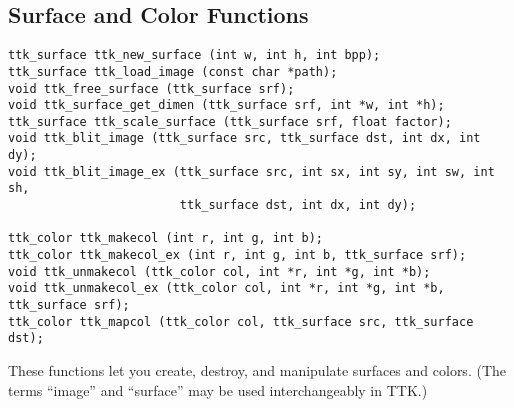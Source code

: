 \documentclass[12pt,letterpaper]{report}
\begin{document}
\subsection{Surface and Color Functions}
{\footnotesize\begin{verbatim}
ttk_surface ttk_new_surface (int w, int h, int bpp);
ttk_surface ttk_load_image (const char *path);
void ttk_free_surface (ttk_surface srf);
void ttk_surface_get_dimen (ttk_surface srf, int *w, int *h);
ttk_surface ttk_scale_surface (ttk_surface srf, float factor);
void ttk_blit_image (ttk_surface src, ttk_surface dst, int dx, int dy);
void ttk_blit_image_ex (ttk_surface src, int sx, int sy, int sw, int sh,
                        ttk_surface dst, int dx, int dy);

ttk_color ttk_makecol (int r, int g, int b);
ttk_color ttk_makecol_ex (int r, int g, int b, ttk_surface srf);
void ttk_unmakecol (ttk_color col, int *r, int *g, int *b);
void ttk_unmakecol_ex (ttk_color col, int *r, int *g, int *b, ttk_surface srf);
ttk_color ttk_mapcol (ttk_color col, ttk_surface src, ttk_surface dst);
\end{verbatim}
}

These functions let you create, destroy, and manipulate surfaces and colors.
(The terms ``image'' and ``surface'' may be used interchangeably in TTK.)
\end{document}
